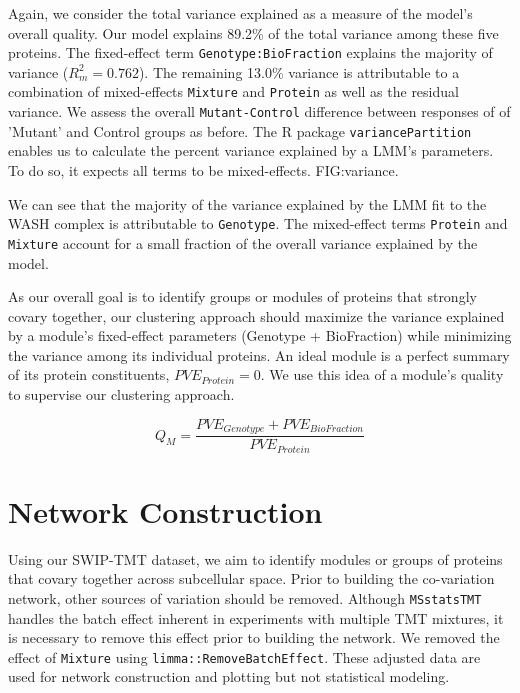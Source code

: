 \documentclass[11pt]{elife}\usepackage[]{graphicx}\usepackage[]{color}
\begin{document}
Again, we consider the total variance explained as a measure of the model's
overall quality. Our model explains 89.2\% of the total variance among these
five proteins. The fixed-effect term \texttt{Genotype:BioFraction} explains the
majority of variance ($R^2_m=0.762$). The remaining 13.0\% variance is
attributable to a combination of mixed-effects \texttt{Mixture} and
\texttt{Protein} as well as the residual variance. We assess the overall
\texttt{Mutant-Control} difference between responses of of 'Mutant' and Control
groups as before. The R package \texttt{variancePartition} enables us to
calculate the percent variance explained by a LMM's parameters. To do so, it
expects all terms to be mixed-effects. FIG:variance.






We can see that the majority of the variance explained by the LMM fit to the
WASH complex is attributable to \texttt{Genotype}. The mixed-effect terms
\texttt{Protein} and \texttt{Mixture} account for a small fraction of the 
overall variance explained by the model.

As our overall goal is to identify groups or modules of proteins that strongly
covary together, our clustering approach should maximize the variance explained
by a module's fixed-effect parameters (Genotype + BioFraction) while minimizing 
the variance among its individual proteins. 
An ideal module is a perfect summary of its protein constituents, 
$PVE_{Protein}=0$. We use this idea of a module's quality to supervise our 
clustering approach.

\begin{equation}
	Q_{M}=\frac{PVE_{Genotype} + PVE_{BioFraction}}{PVE_{Protein}}
\end{equation}


\section{Network Construction}

Using our SWIP-TMT dataset, we aim to identify modules or groups of
proteins that covary together across subcellular space. Prior to building the
co-variation network, other sources of variation should be removed. Although
\texttt{MSstatsTMT} handles the batch effect inherent in experiments with
multiple TMT mixtures, it is necessary to remove this effect prior to building
the network. We removed the effect of \texttt{Mixture} using
\texttt{limma::RemoveBatchEffect}. These adjusted data are used for network
construction and plotting but not statistical modeling.
\end{document}
